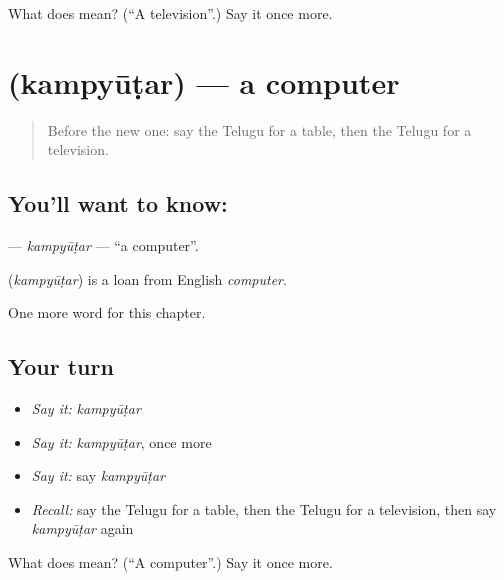 \begin{tcolorbox}[breakable,colback=teal!4,colframe=teal!35!black,title={Before you move on}]
What does  mean? (\textquotedblleft{}A television\textquotedblright{}.) Say it once more.
\end{tcolorbox}
\section[\texorpdfstring{\te{కంప్యూటర్} (kampyūṭar)}{కంప్యూటర్ (kampyūṭar)}]{ (kampyūṭar) — a computer}

\label{lesson:TE-C130-kampyutar}



\begin{quote}
Before the new one: say the Telugu for a table, then the Telugu for a television.
\end{quote}

\subsection*{You'll want to know: }
\textbf{} — \emph{kampyūṭar} — \textquotedblleft{}a computer\textquotedblright{}.

\begin{cousinweb}
\textbf{} (\emph{kampyūṭar}) is a loan from English \emph{computer}.
\end{cousinweb}

\begin{grammarlens}[title={What you've built}]
One more word for this chapter.
\end{grammarlens}

\subsection*{Your turn}
\begin{itemize}
\raggedright
  \item \emph{Say it:} \emph{kampyūṭar}
  \item \emph{Say it:} \emph{kampyūṭar}, once more
  \item \emph{Say it:} say \emph{kampyūṭar}
  \item \emph{Recall:} say the Telugu for a table, then the Telugu for a television, then say \emph{kampyūṭar} again
\end{itemize}

\begin{tcolorbox}[breakable,colback=teal!4,colframe=teal!35!black,title={Before you move on}]
What does  mean? (\textquotedblleft{}A computer\textquotedblright{}.) Say it once more.
\end{tcolorbox}
